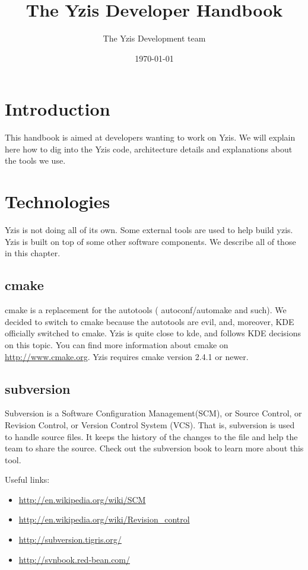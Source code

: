 \documentclass[a4paper,12pt]{report}
\title{The Yzis Developer Handbook}
\date{\today}
\author{The Yzis Development team}
\begin{document}
\maketitle
\tableofcontents

% 


\chapter{Introduction}

This handbook is aimed at developers wanting to work on Yzis. We will
explain here how to dig into the Yzis code, architecture details and
explanations about the tools we use.


\chapter{Technologies}
Yzis is not doing all of its own. Some external tools are used to help
build yzis. Yzis is built on top of some other software components. We describe
all of those in this chapter.

\section{cmake}
cmake is a replacement for the autotools ( autoconf/automake and such). We
decided to switch to cmake because the autotools are evil, and, moreover,
KDE officially switched to cmake. Yzis is quite close to kde, and follows
KDE decisions on this topic.
You can find more information about cmake on \url{http://www.cmake.org}.
Yzis requires cmake version 2.4.1 or newer.

\section{subversion}
Subversion is a Software Configuration Management(SCM), or Source Control,
or Revision Control, or Version Control System (VCS). That is, subversion
is used to handle source files. It keeps the history of the changes to the
file and help the team to share the source.
Check out the subversion book to learn more about this tool.

Useful links:
\begin{itemize}
\item \url{http://en.wikipedia.org/wiki/SCM}
\item \url{http://en.wikipedia.org/wiki/Revision\_control}
\item \url{http://subversion.tigris.org/}
\item \url{http://svnbook.red-bean.com/}
\end{itemize}
\end{document}
